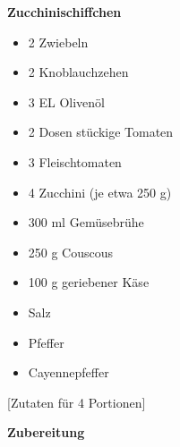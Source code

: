 

\parindent0pt	

\pagestyle{empty}


\textbf{{\LARGE Zucchinischiffchen}}%

\hrulefill
\vspace*{\fill}
\begin{multicols}{2}	


\begin{itemize}
\item 2 	Zwiebeln
\item 2 	Knoblauchzehen
\item 3	EL 	Olivenöl	
\item 2 Dosen	stückige Tomaten
\item 3 	Fleischtomaten
\item 4 	Zucchini (je etwa 250 g)
\item 300 ml	Gemüsebrühe
\item 250 g	Couscous
\item 100 g	geriebener Käse
\item Salz
\item Pfeffer
\item Cayennepfeffer
\end{itemize}
\end{multicols}
\vfill									%


%
\begin{center}
%
[Zutaten für 4 Portionen]%
\end{center}


\vfill
\newpage
\textbf{{\LARGE Zubereitung}}%

\hrulefill

